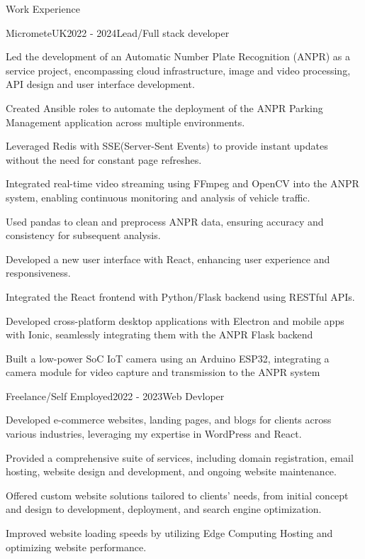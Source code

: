 \documentclass{resume}
\begin{document}
\begin{rSection}{Work Experience}
\begin{rSubsection}{MicrometeUK}{2022 -  2024}{Lead/Full stack developer}

\item Led the development of an Automatic Number Plate Recognition (ANPR) as a service project, encompassing  cloud infrastructure, image and video  processing, API design and  user interface development.
\item Created Ansible roles to automate the deployment of the ANPR Parking Management application across multiple environments.
\item Leveraged Redis  with SSE(Server-Sent Events) to provide instant updates without  the need for constant page refreshes.
\item Integrated real-time video streaming using FFmpeg and OpenCV into the ANPR system, enabling continuous monitoring and analysis of vehicle traffic.
\item Used pandas to clean and preprocess ANPR data, ensuring accuracy and consistency for subsequent analysis.
\item Developed a new user interface with React, enhancing user experience and responsiveness.
\item Integrated the React frontend with  Python/Flask backend using RESTful APIs.
\item Developed cross-platform desktop applications with Electron and mobile apps with Ionic, seamlessly integrating them with the ANPR Flask backend
\item Built a low-power SoC IoT camera using an  Arduino ESP32, integrating a camera module for video capture and transmission to the ANPR system
\end{rSubsection}
\begin{rSubsection}{Freelance/Self Employed}{2022 - 2023}{Web Devloper }{}
\item Developed e-commerce websites, landing pages, and blogs for clients across various industries, leveraging my expertise in  WordPress and React.
\item Provided a comprehensive suite of services, including domain registration, email hosting, website design and development, and ongoing website maintenance.
\item Offered custom website solutions tailored to clients' needs, from initial concept and design to development, deployment, and search engine optimization.
\item Improved website loading speeds  by utilizing Edge Computing Hosting and optimizing website performance.

\end{rSubsection}
\end{rSection}
\end{document}
